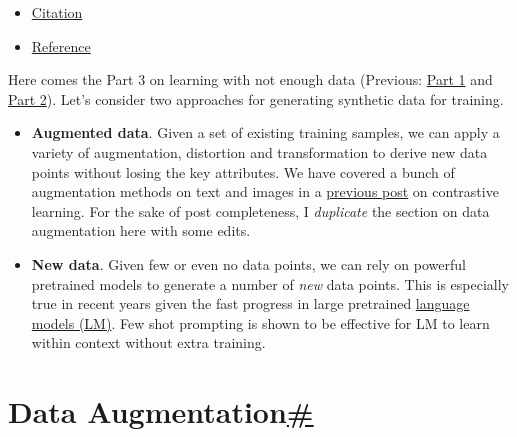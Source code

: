\begin{itemize}
  \begin{itemize}
  \tightlist
  \item
    \hyperref[regularization-and-robust-architecture]{Regularization and Robust Architecture}
  \item
    \hyperref[robust-learning-objective]{Robust Learning Objective}
  \item
    \hyperref[label-correction]{Label Correction}
  \item
    \hyperref[sample-reweighting-and-selection]{Sample Reweighting and Selection}
  \end{itemize}
\item
  \hyperref[citation]{Citation}
\item
  \hyperref[reference]{Reference}
\end{itemize}

Here comes the Part 3 on learning with not enough data (Previous: \href{https://lilianweng.github.io/posts/2021-12-05-semi-supervised/}{Part 1} and \href{https://lilianweng.github.io/posts/2022-02-20-active-learning/}{Part 2}). Let's consider two approaches for generating synthetic data for training.

\begin{itemize}
\tightlist
\item
  \textbf{Augmented data}. Given a set of existing training samples, we can apply a variety of augmentation, distortion and transformation to derive new data points without losing the key attributes. We have covered a bunch of augmentation methods on text and images in a \href{https://lilianweng.github.io/posts/2021-05-31-contrastive/}{previous post} on contrastive learning. For the sake of post completeness, I \emph{duplicate} the section on data augmentation here with some edits.
\item
  \textbf{New data}. Given few or even no data points, we can rely on powerful pretrained models to generate a number of \emph{new} data points. This is especially true in recent years given the fast progress in large pretrained \href{https://lilianweng.github.io/posts/2019-01-31-lm/}{language models (LM)}. Few shot prompting is shown to be effective for LM to learn within context without extra training.
\end{itemize}

\section{\texorpdfstring{Data Augmentation\hyperref[data-augmentation]{\#}}{Data Augmentation\#}}\label{data-augmentation}

